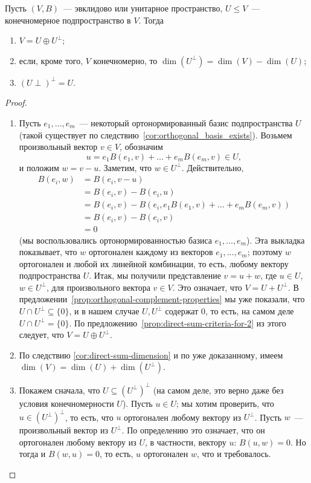 \begin{proposition}\label{prop:orthogonal-complement-properties-findim}
Пусть $(V,B)$~--- эвклидово или унитарное пространство,
$U\leq V$~--- конечномерное подпространство в $V$. Тогда
\begin{enumerate}
\item\label{num:orth-comp-prop-findim-1} $V = U\oplus U^\perp$;
\item если, кроме того, $V$ конечномерно, то $\dim (U^\perp) = \dim (V) - \dim (U)$;
\item $(U\perp)^\perp = U$.
\end{enumerate}
\end{proposition}
\begin{proof}
\begin{enumerate}
\item Пусть $e_1,\dots,e_m$~--- некоторый ортонормированный базис
  подпространства $U$ (такой существует по
  следствию~\ref{cor:orthogonal_basis_exists}).
  Возьмем произвольный вектор $v\in V$, обозначим
  $$
  u = e_1 B(e_1,v) + \dots + e_m B(e_m,v) \in U,
  $$
  и положим $w = v-u$.
  Заметим, что $w\in U^\perp$. Действительно,
  \begin{align*}
  B(e_i,w) &= B(e_i,v-u) \\
  &= B(e_i,v) - B(e_i,u) \\
  &= B(e_i,v) - B(e_i,e_1 B(e_1,v) + \dots + e_m B(e_m,v)) \\
  &= B(e_i,v) - B(e_i,v) \\
  &= 0
  \end{align*}
  (мы воспользовались ортонормированностью базиса $e_1,\dots,e_m$).
  Эта выкладка показывает, что $w$ ортогонален каждому из векторов
  $e_1,\dots,e_m$; поэтому $w$ ортогонален и любой их линейной комбинации,
  то есть, любому вектору подпространства $U$.
  Итак, мы получили представление $v = u + w$, где $u\in U$, $w\in U^\perp$,
  для произвольного вектора $v\in V$. Это означает, что $V = U + U^\perp$.
  В предложении~\ref{prop:orthogonal-complement-properties} мы уже показали,
  что $U\cap U^\perp \subseteq \{0\}$, и в нашем случае $U,U^\perp$ содержат $0$,
  то есть, на самом деле $U\cap U^\perp = \{0\}$.
  По предложению~\ref{prop:direct-sum-criteria-for-2} из этого следует, что
  $V = U\oplus U^\perp$.
\item По следствию \ref{cor:direct-sum-dimension} и по уже доказанному,
  имеем $\dim(V) = \dim(U) + \dim(U^\perp)$.
\item Покажем сначала, что $U\subseteq (U^\perp)^\perp$ (на самом деле, это
  верно даже без условия конечномерности $U$). Пусть $u\in U$; мы хотим проверить,
  что $u\in (U^\perp)^\perp$, то есть, что $u$ ортогонален любому вектору
  из $U^\perp$. Пусть $w$~--- произвольный вектор из $U^\perp$. По определению
  это означает, что он ортогонален любому вектору из $U$, в частности, вектору $u$:
  $B(u,w) = 0$. Но тогда и $B(w,u) = 0$, то есть, $u$ ортогонален $w$, что и
  требовалось.


\end{enumerate}
\end{proof}
